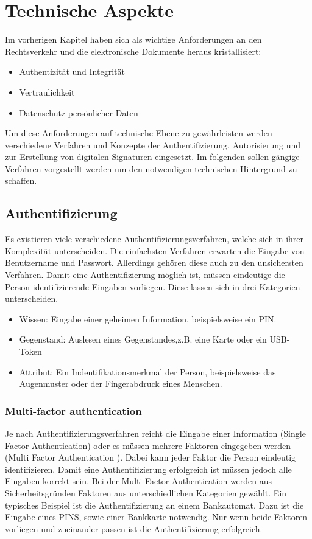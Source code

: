 
\section{Technische Aspekte}
Im vorherigen Kapitel haben sich als wichtige Anforderungen an den Rechtsverkehr und die elektronische Dokumente heraus kristallisiert:
\begin{itemize}
\item Authentizität und Integrität
\item Vertraulichkeit
\item Datenschutz persönlicher Daten
\end{itemize}
Um diese Anforderungen auf technische Ebene zu gewährleisten werden verschiedene Verfahren und Konzepte der Authentifizierung, Autorisierung und zur Erstellung von digitalen Signaturen eingesetzt. Im folgenden sollen gängige Verfahren vorgestellt werden um den notwendigen  technischen Hintergrund zu schaffen. 
\subsection{Authentifizierung}
Es existieren viele verschiedene Authentifizierungsverfahren, welche sich in ihrer Komplexität unterscheiden. Die einfachsten Verfahren erwarten die Eingabe von Benutzername und Passwort. Allerdings gehören diese auch zu den unsichersten Verfahren. Damit eine Authentifizierung möglich ist, müssen eindeutige die Person identifizierende Eingaben vorliegen. Diese lassen sich in drei Kategorien unterscheiden.
\begin{itemize}
\item Wissen: Eingabe einer geheimen Information, beispielsweise ein PIN.
\item Gegenstand: Auslesen eines Gegenstandes,z.B. eine Karte oder ein USB-Token
\item Attribut: Ein Indentifikationsmerkmal der Person, beispielsweise das Augenmuster oder der Fingerabdruck eines Menschen.
\end{itemize}
\subsubsection{Multi-factor authentication}
Je nach Authentifizierungsverfahren reicht die Eingabe einer Information (Single Factor Authentication) oder es müssen mehrere Faktoren eingegeben werden (Multi Factor Authentication ).
Dabei kann jeder Faktor die Person eindeutig identifizieren. Damit eine Authentifizierung erfolgreich ist müssen jedoch alle Eingaben korrekt sein. Bei der Multi Factor Authentication werden aus Sicherheitsgründen Faktoren aus unterschiedlichen Kategorien gewählt. Ein typisches Beispiel ist die Authentifizierung an einem Bankautomat. Dazu ist die Eingabe eines PINS, sowie einer Bankkarte notwendig. Nur wenn beide Faktoren vorliegen und zueinander passen ist die Authentifizierung erfolgreich. 
